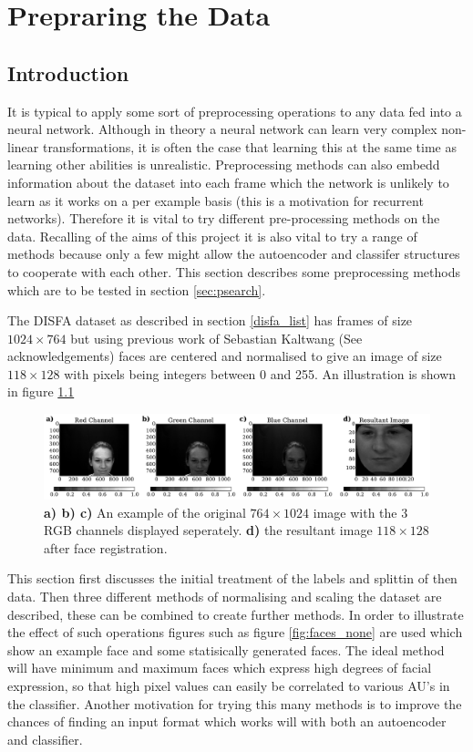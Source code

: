\chapter{Prepraring the Data}
  \section{Introduction}
    It is typical to apply some sort of preprocessing operations to any data fed into
    a neural network. Although in theory a neural network can learn very complex
    non-linear transformations, it is often the case that learning this at the same
    time as learning other abilities is unrealistic. Preprocessing methods can
    also embedd information about the dataset into each frame which the network is
    unlikely to learn as it works on a per example basis (this is a motivation for
    recurrent networks).
     Therefore it is vital to try
    different pre-processing methods on the data.
    Recalling of the aims of this project it is also vital to try a range of methods
    because only a few
    might allow the autoencoder and classifer structures to cooperate with each other.
    This section describes some preprocessing methods which are to be
    tested in section \ref{sec:psearch}.


    The DISFA dataset as described in section \ref{disfa_list} has frames of size $ 1024 \times 764 $
    but using previous work of Sebastian Kaltwang (See acknowledgements) faces are
    centered and normalised to give an image of size $118 \times 128$
    with pixels being integers between
    0 and 255. An illustration is shown in figure \ref{fig:sebproc}

    \begin{figure}[!h] \centering
    \includegraphics[width =\hsize]{figures/seb_preproc.pdf}
    \caption{ {\bf a) b) c)} An example of the original $764 \times 1024$ image with
    the 3 RGB channels displayed seperately. {\bf d)} the resultant image
    $118 \times 128$ after face registration.} \label{fig:sebproc} \end{figure}


    This section first discusses the initial treatment of the labels and splittin of then data.
    Then three different methods of normalising and scaling
    the dataset are described, these can be combined to create further methods. In order to illustrate
    the effect of such operations figures such as figure \ref{fig:faces_none} are used which
    show an example face and some statisically generated faces. The ideal method will
    have minimum and maximum faces which express high degrees of facial expression, so that
    high pixel values can easily be correlated to various AU's in the classifier. Another motivation
    for trying this many methods is to improve the chances of finding an input format which works will with both an
    autoencoder and classifier.


